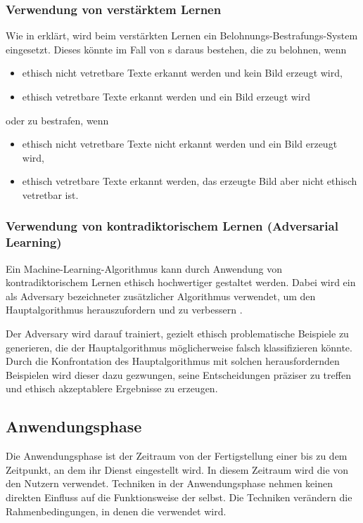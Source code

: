 \documentclass[hidelinks,12pt]{report}
\begin{document}
\subsubsection{Verwendung von verstärktem Lernen}
Wie in  erklärt, wird beim verstärkten Lernen ein Belohnungs-Bestrafungs-System eingesetzt. Dieses könnte im Fall von s daraus bestehen, die  zu belohnen, wenn 

\begin{itemize}
    \item ethisch nicht vetretbare Texte erkannt werden und kein Bild erzeugt wird,
    \item ethisch vetretbare Texte erkannt werden und ein Bild erzeugt wird
\end{itemize}
oder zu bestrafen, wenn
\begin{itemize}
    \item ethisch nicht vetretbare Texte nicht erkannt werden und ein Bild erzeugt wird,
    \item ethisch vetretbare Texte erkannt werden, das erzeugte Bild aber nicht ethisch vetretbar ist.
\end{itemize}  

\subsubsection{Verwendung von kontradiktorischem Lernen (Adversarial Learning)}
Ein Machine-Learning-Algorithmus kann durch Anwendung von kontradiktorischem Lernen ethisch hochwertiger gestaltet werden. Dabei wird ein als Adversary bezeichneter zusätzlicher Algorithmus verwendet, um den Hauptalgorithmus herauszufordern und zu verbessern \cite[S. 3]{Kurakin}. 

Der Adversary wird darauf trainiert, gezielt ethisch problematische Beispiele zu generieren, die der Hauptalgorithmus möglicherweise falsch klassifizieren könnte. Durch die Konfrontation des Hauptalgorithmus mit solchen herausfordernden Beispielen wird dieser dazu gezwungen, seine Entscheidungen präziser zu treffen und ethisch akzeptablere Ergebnisse zu erzeugen.

\subsection{Anwendungsphase}
Die Anwendungsphase ist der Zeitraum von der Fertigstellung einer  bis zu dem Zeitpunkt, an dem ihr Dienst eingestellt wird. In diesem Zeitraum wird die  von den Nutzern verwendet. Techniken in der Anwendungsphase nehmen keinen direkten Einfluss auf die Funktionsweise der  selbst. Die Techniken verändern die Rahmenbedingungen, in denen die  verwendet wird.
\end{document}
